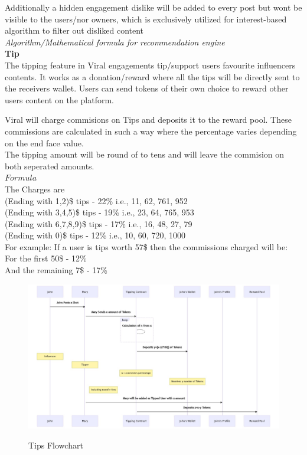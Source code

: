\documentclass[10pt]{article}
\begin{document}
Additionally a hidden engagement dislike will be added to every post but won\textsc{}t be visible to the users/nor owners, which is exclusively utilized for interest-based algorithm to filter out disliked content\\

\textit{Algorithm/Mathematical formula for recommendation engine}\\

\textbf{Tip}\\

The tipping feature in Viral engagements tip/support user\textsc{}s favourite influencers\textsc{} contents. It works as a donation/reward where all the tips will be directly sent to the receivers wallet. Users can send tokens of their own choice to reward other users content on the platform.

Viral will charge commisions on Tips and deposits it to the reward pool. These commissions are calculated in such a way where the percentage varies depending on the end face value.\\

The tipping amount will be round of to tens and will leave the commision on both seperated amounts.\\

$Formula$\\

The Charges are\\


(Ending with 1,2)\$ tips     - 22\%      i.e., 11, 62, 761, 952\\
(Ending with 3,4,5)\$ tips   - 19\%      i.e., 23, 64, 765, 953\\
(Ending with 6,7,8,9)\$ tips - 17\%      i.e., 16, 48, 27,  79\\
(Ending with 0)\$ tips       - 12\%      i.e., 10, 60, 720, 1000\\


For example: If a user is tips worth 57\$ then the commissions charged will be:\\

For the first     50\$ - 12\%\\
And the remaining 7\$  - 17\%\\
\begin{figure}[H]
\includegraphics[width=\textwidth]{tips}\\
\caption{Tips Flowchart}
\end{figure}
\end{document}
